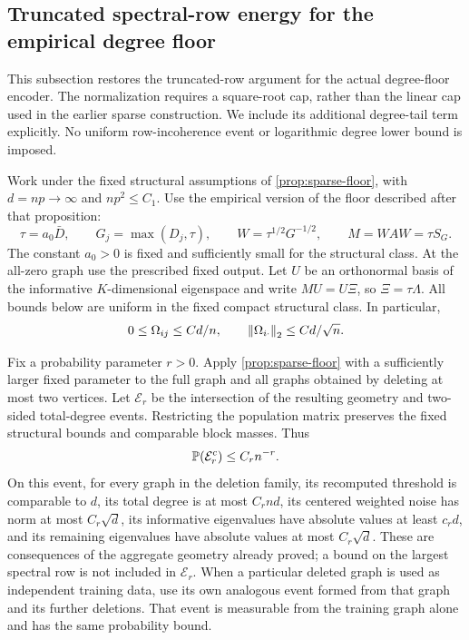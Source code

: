 \subsection{Truncated spectral-row energy for the empirical degree floor}
\label{restore:tail-section}

This subsection restores the truncated-row argument for the actual
degree-floor encoder.  The normalization requires a square-root cap,
rather than the linear cap used in the earlier sparse construction.
We include its additional degree-tail term explicitly.  No uniform
row-incoherence event or logarithmic degree lower bound is imposed.

Work under the fixed structural assumptions of
\cref{prop:sparse-floor}, with $d=np\to\infty$ and $np^2\le C_1$.
Use the empirical version of the floor described after that proposition:
\[
 \tau=a_0\bar D,\qquad
 G_j=\max(D_j,\tau),\qquad
 W=\tau^{1/2}G^{-1/2},\qquad M=WAW=\tau S_G.
\]
The constant $a_0>0$ is fixed and sufficiently small for the structural
class.  At the all-zero graph use the prescribed fixed output.
Let $U$ be an orthonormal basis of the informative $K$-dimensional
eigenspace and write $MU=U\Xi$, so $\Xi=\tau\Lambda$.
All bounds below are uniform in the fixed compact structural class.
In particular,
\begin{equation}
 0\le\Omega_{ij}\le Cd/n,\qquad
 \left\lVert\Omega_{i\cdot}\right\rVert_2\le Cd/\sqrt n.
 \label{restore:tail-population-rows}
\end{equation}

Fix a probability parameter $r>0$.  Apply
\cref{prop:sparse-floor} with a sufficiently larger fixed parameter to
the full graph and all graphs obtained by deleting at most two vertices.
Let $\mathcal E_r$ be the intersection of the resulting geometry and
two-sided total-degree events.  Restricting the population matrix
preserves the fixed structural bounds and comparable block masses.
Thus
\begin{equation}
 \mathbb P(\mathcal E_r^c)\le C_rn^{-r}.
 \label{restore:tail-geometry-probability}
\end{equation}
On this event, for every graph in the deletion family, its recomputed
threshold is comparable to $d$, its total degree is at most $C_rnd$,
its centered weighted noise has norm at most $C_r\sqrt d$, its
informative eigenvalues have absolute values at least $c_rd$, and its
remaining eigenvalues have absolute values at most $C_r\sqrt d$.
These are consequences of the aggregate geometry already proved; a
bound on the largest spectral row is not included in
$\mathcal E_r$.  When a particular deleted graph is used as independent
training data, use its own analogous event formed from that graph and
its further deletions.  That event is measurable from the training
graph alone and has the same probability bound.

